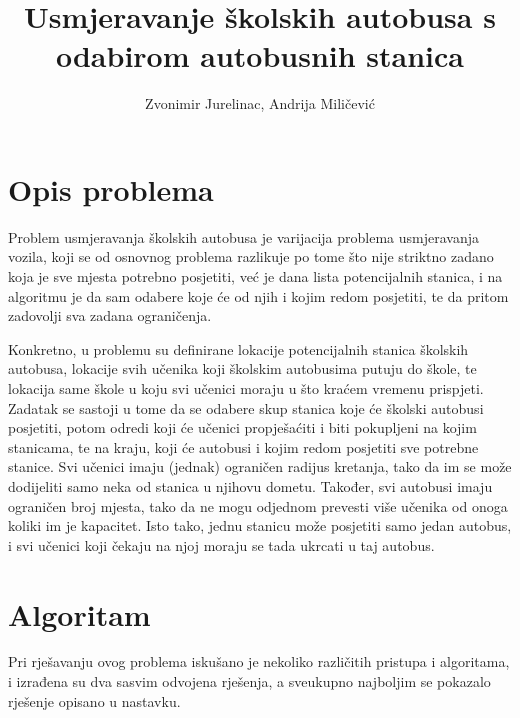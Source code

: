 \documentclass[times, utf8, seminar, numeric]{fer}
\begin{document}
\nocite{*}

\title{Usmjeravanje školskih autobusa s odabirom autobusnih stanica}

\author{Zvonimir Jurelinac, Andrija Miličević}


\maketitle

\tableofcontents

\chapter{Opis problema}
Problem usmjeravanja školskih autobusa je varijacija problema usmjeravanja vozila, koji se od osnovnog problema razlikuje po tome što nije striktno zadano koja je sve mjesta potrebno posjetiti, već je dana lista potencijalnih stanica, i na algoritmu je da sam odabere koje će od njih i kojim redom posjetiti, te da pritom zadovolji sva zadana ograničenja.

Konkretno, u problemu su definirane lokacije potencijalnih stanica školskih autobusa, lokacije svih učenika koji školskim autobusima putuju do škole, te lokacija same škole u koju svi učenici moraju u što kraćem vremenu prispjeti. Zadatak se sastoji u tome da se odabere skup stanica koje će školski autobusi posjetiti, potom odredi koji će učenici propješaćiti i biti pokupljeni na kojim stanicama, te na kraju, koji će autobusi i kojim redom posjetiti sve potrebne stanice. Svi učenici imaju (jednak) ograničen radijus kretanja, tako da im se može dodijeliti samo neka od stanica u njihovu dometu. Također, svi autobusi imaju ograničen broj mjesta, tako da ne mogu odjednom prevesti više učenika od onoga koliki im je kapacitet. Isto tako, jednu stanicu može posjetiti samo jedan autobus, i svi učenici koji čekaju na njoj moraju se tada ukrcati u taj autobus.

\chapter{Algoritam}
Pri rješavanju ovog problema iskušano je nekoliko različitih pristupa i algoritama, i izrađena su dva sasvim odvojena rješenja, a sveukupno najboljim se pokazalo rješenje opisano u nastavku.
\end{document}
